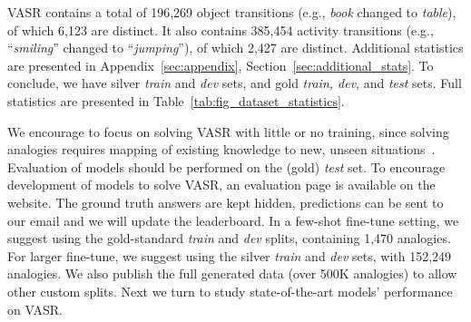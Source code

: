 \documentclass[letterpaper]{article} \usepackage{aaai23}  \usepackage{times}  \usepackage{helvet}  \usepackage{courier}  \usepackage[hyphens]{url}  \usepackage{graphicx} \urlstyle{rm} \def\UrlFont{\rm}  \usepackage{natbib}  \usepackage{caption} \frenchspacing  \setlength{\pdfpagewidth}{8.5in}  \setlength{\pdfpageheight}{11in}  \usepackage{algorithm}
\begin{document}
VASR contains a total of 196,269 object transitions (e.g., \emph{book} changed to \emph{table}), of which 6,123 are distinct. It also contains 385,454 activity transitions (e.g., ``\emph{smiling}'' changed to ``\emph{jumping}''), of which 2,427 are distinct. Additional statistics are presented in Appendix~\ref{sec:appendix}, Section~\ref{sec:additional_stats}. To conclude, we have silver \emph{train} and \emph{dev} sets, and gold \emph{train, dev}, and \textit{test} sets. Full statistics are presented in Table~\ref{tab:fig_dataset_statistics}.

We encourage to focus on solving VASR with little or no training, since solving analogies requires mapping of existing knowledge to new, unseen situations~\cite{mitchell2021abstraction}. Evaluation of models should be performed on the (gold) \emph{test} set. To encourage development of models to solve VASR, an evaluation page is available on the website. The ground truth answers are kept hidden, predictions can be sent to our email and we will update the leaderboard. In a few-shot fine-tune setting, we suggest using the gold-standard \emph{train} and \emph{dev} splits, containing 1,470 analogies. For larger fine-tune, we suggest using the silver \emph{train} and \emph{dev} sets, with 152,249 analogies. We also publish the full generated data (over 500K analogies) to allow other custom splits. Next we turn to study state-of-the-art models' performance on VASR.

\begin{table}[!tb]
\caption{VASR statistics. Rows 1-2 describe the silver data, and rows 3-5 describe the gold-standard data.}
\label{tab:fig_dataset_statistics}
\centering
{}
\end{table}
\end{document}
